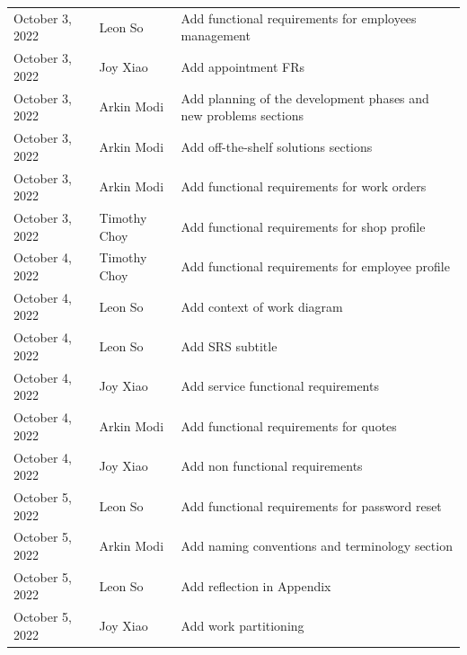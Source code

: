 \documentclass[12pt]{article}
\begin{document}
\begin{table}[H]
\begin{tabularx}{\textwidth}{llX}
		October 3, 2022    & Leon So               & Add functional requirements for employees management                               \\
		October 3, 2022    & Joy Xiao              & Add appointment FRs                                                                \\
		October 3, 2022    & Arkin Modi            & Add planning of the development phases and new problems sections                   \\
		October 3, 2022    & Arkin Modi            & Add off-the-shelf solutions sections                                               \\
		October 3, 2022    & Arkin Modi            & Add functional requirements for work orders                                        \\
		October 3, 2022    & Timothy Choy          & Add functional requirements for shop profile                                       \\
		October 4, 2022    & Timothy Choy          & Add functional requirements for employee profile                                   \\
		October 4, 2022    & Leon So               & Add context of work diagram                                                        \\
		October 4, 2022    & Leon So               & Add SRS subtitle                                                                   \\
		October 4, 2022    & Joy Xiao              & Add service functional requirements                                                \\
		October 4, 2022    & Arkin Modi            & Add functional requirements for quotes                                             \\
		October 4, 2022    & Joy Xiao              & Add non functional requirements                                                    \\
		October 5, 2022    & Leon So               & Add functional requirements for password reset                                     \\
		October 5, 2022    & Arkin Modi            & Add naming conventions and terminology section                                     \\
		October 5, 2022    & Leon So               & Add reflection in Appendix                                                         \\
		October 5, 2022    & Joy Xiao              & Add work partitioning                                                              \\

\end{tabularx}
\end{table}
\end{document}
